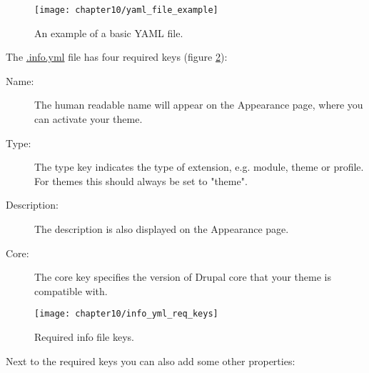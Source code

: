 \begin{figure}[H]
	\centering
	\texttt{[image: chapter10/yaml\_file\_example]}
	\caption{An example of a basic YAML file.}
	\label{fig:yaml_file_example}
\end{figure}

The \url{.info.yml} file has four required keys (figure \ref{fig:info_yml_req_keys}):
\begin{description}
	\item[Name:] The human readable name will appear on the Appearance page, where you can activate your theme.
	\item[Type:] The type key indicates the type of extension, e.g. module, theme or profile. For themes this should always be set to "theme".
	\item[Description:] The description is also displayed on the Appearance page.
	\item[Core:] The core key specifies the version of Drupal core that your theme is compatible with.
\end{description}

\begin{figure}[H]
	\centering
	\texttt{[image: chapter10/info\_yml\_req\_keys]}
	\caption{Required info file keys.}
	\label{fig:info_yml_req_keys}
\end{figure}

Next to the required keys you can also add some other properties:

